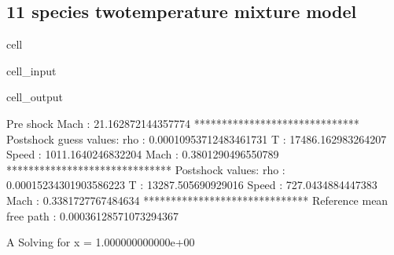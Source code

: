 \documentclass[letterpaper,10pt,english]{jupyterBook}
\begin{document}
\subsection{11 species two\sphinxhyphen{}temperature mixture model}
\label{\detokenize{Results/Results:id4}}
\begin{sphinxuseclass}{cell}\begin{sphinxVerbatimInput}

\begin{sphinxuseclass}{cell_input}
\begin{sphinxVerbatim}[commandchars=\\\{\}]
  

    
  
  

\end{sphinxVerbatim}

\end{sphinxuseclass}\end{sphinxVerbatimInput}
\begin{sphinxVerbatimOutput}

\begin{sphinxuseclass}{cell_output}
\begin{sphinxVerbatim}[commandchars=\\\{\}]
Pre shock Mach : 21.162872144357774
******************************
Post\PYGZhy{}shock guess values:
rho    : 0.00010953712483461731
T      : 17486.162983264207
Speed  : 1011.1640246832204
Mach   : 0.3801290496550789
******************************
Post\PYGZhy{}shock values:
rho    : 0.00015234301903586223
T      : 13287.505690929016
Speed  : 727.0434884447383
Mach   : 0.3381727767484634
******************************
Reference mean free path : 0.00036128571073294367

A Solving for x = 1.000000000000e+00
\end{sphinxVerbatim}

\end{sphinxuseclass}\end{sphinxVerbatimOutput}

\end{sphinxuseclass}
\end{document}
